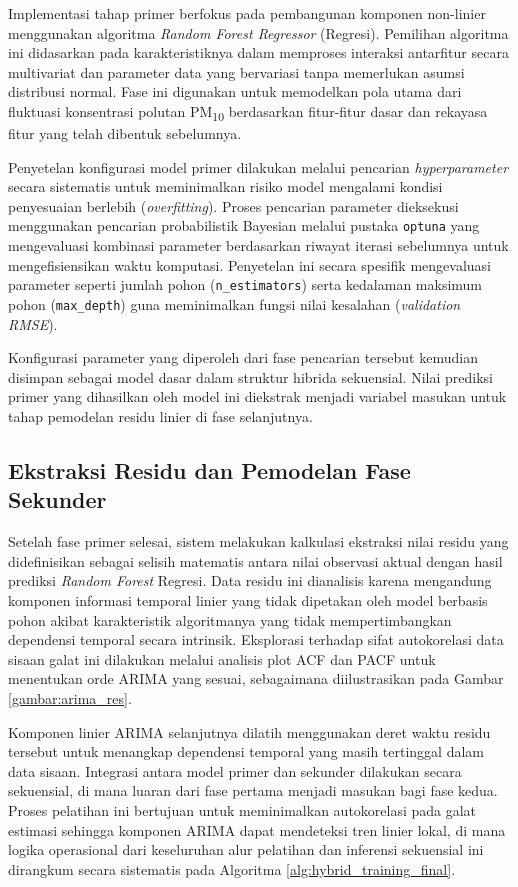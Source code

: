 Implementasi tahap primer berfokus pada pembangunan komponen non-linier menggunakan algoritma \textit{Random Forest Regressor} (Regresi). Pemilihan algoritma ini didasarkan pada karakteristiknya dalam memproses interaksi antarfitur secara multivariat dan parameter data yang bervariasi tanpa memerlukan asumsi distribusi normal. Fase ini digunakan untuk memodelkan pola utama dari fluktuasi konsentrasi polutan PM\textsubscript{10} berdasarkan fitur-fitur dasar dan rekayasa fitur yang telah dibentuk sebelumnya.

Penyetelan konfigurasi model primer dilakukan melalui pencarian \textit{hyperparameter} secara sistematis untuk meminimalkan risiko model mengalami kondisi penyesuaian berlebih (\textit{overfitting}). Proses pencarian parameter dieksekusi menggunakan pencarian probabilistik Bayesian melalui pustaka \texttt{optuna} yang mengevaluasi kombinasi parameter berdasarkan riwayat iterasi sebelumnya untuk mengefisiensikan waktu komputasi. Penyetelan ini secara spesifik mengevaluasi parameter seperti jumlah pohon (\texttt{n\_estimators}) serta kedalaman maksimum pohon (\texttt{max\_depth}) guna meminimalkan fungsi nilai kesalahan (\textit{validation RMSE}).

Konfigurasi parameter yang diperoleh dari fase pencarian tersebut kemudian disimpan sebagai model dasar dalam struktur hibrida sekuensial. Nilai prediksi primer yang dihasilkan oleh model ini diekstrak menjadi variabel masukan untuk tahap pemodelan residu linier di fase selanjutnya. 

\subsection{Ekstraksi Residu dan Pemodelan Fase Sekunder}

Setelah fase primer selesai, sistem melakukan kalkulasi ekstraksi nilai residu yang didefinisikan sebagai selisih matematis antara nilai observasi aktual dengan hasil prediksi \textit{Random Forest} Regresi. Data residu ini dianalisis karena mengandung komponen informasi temporal linier yang tidak dipetakan oleh model berbasis pohon akibat karakteristik algoritmanya yang tidak mempertimbangkan dependensi temporal secara intrinsik. Eksplorasi terhadap sifat autokorelasi data sisaan galat ini dilakukan melalui analisis plot ACF dan PACF untuk menentukan orde ARIMA yang sesuai, sebagaimana diilustrasikan pada Gambar \ref{gambar:arima_res}.

Komponen linier ARIMA selanjutnya dilatih menggunakan deret waktu residu tersebut untuk menangkap dependensi temporal yang masih tertinggal dalam data sisaan. Integrasi antara model primer dan sekunder dilakukan secara sekuensial, di mana luaran dari fase pertama menjadi masukan bagi fase kedua. Proses pelatihan ini bertujuan untuk meminimalkan autokorelasi pada galat estimasi sehingga komponen ARIMA dapat mendeteksi tren linier lokal, di mana logika operasional dari keseluruhan alur pelatihan dan inferensi sekuensial ini dirangkum secara sistematis pada Algoritma \ref{alg:hybrid_training_final}.

